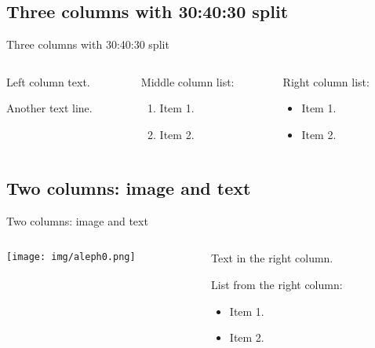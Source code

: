 \documentclass[
  11pt,
  aspectratio=169]{beamer}
\providecommand{\tightlist}{%
  \setlength{\itemsep}{0pt}\setlength{\parskip}{0pt}}
\begin{document}
\subsection{Three columns with 30:40:30
split}\label{three-columns-with-304030-split}

\begin{frame}{Three columns with 30:40:30 split}
\begin{columns}[T]
\begin{column}{0.3\linewidth}
Left column text.

Another text line.
\end{column}

\begin{column}{0.4\linewidth}
Middle column list:

\begin{enumerate}
\tightlist
\item
  Item 1.
\item
  Item 2.
\end{enumerate}
\end{column}

\begin{column}{0.3\linewidth}
Right column list:

\begin{itemize}
\tightlist
\item
  Item 1.
\item
  Item 2.
\end{itemize}
\end{column}
\end{columns}
\end{frame}

\subsection{Two columns: image and
text}\label{two-columns-image-and-text}

\begin{frame}{Two columns: image and text}
\begin{columns}[T]
\begin{column}{0.48\linewidth}
\texttt{[image: img/aleph0.png]}
\end{column}

\begin{column}{0.48\linewidth}
Text in the right column.

List from the right column:

\begin{itemize}
\tightlist
\item
  Item 1.
\item
  Item 2.
\end{itemize}
\end{column}
\end{columns}
\end{frame}
\end{document}
